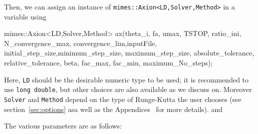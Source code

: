 \documentclass[11pt,a4paper]{article}
\begin{document}
Then, we can assign an instance of {\tt mimes::Axion<LD,Solver,Method>} in a variable using
%
\begin{cpp}
	mimes::Axion<LD,Solver,Method> ax(theta_i, fa, umax, TSTOP, ratio_ini, N_convergence_max,
	convergence_lim,inputFile, initial_step_size,minimum_step_size, maximum_step_size, 
	absolute_tolerance, relative_tolerance, beta, fac_max, fac_min, maximum_No_steps);
\end{cpp}
%
Here, {\tt LD} should be the desirable numeric type to be used; it is recommended to use {\tt long double}, but other choices are also available as we discuss on. Moreover {\tt Solver} and {\tt Method} depend on the type of Runge-Kutta the user chooses (see section~\ref{sec:options} asa well as the Appendices~ for more details). and 

 The various parameters are as follows:
%
\end{document}
